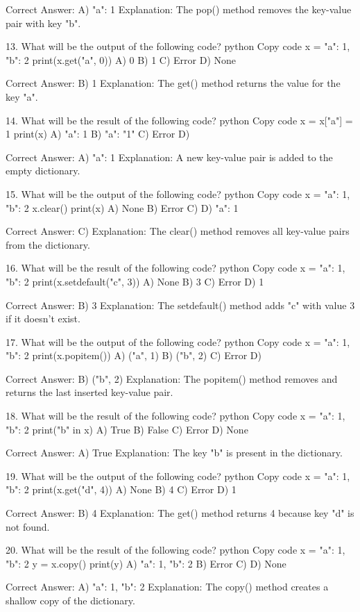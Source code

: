 Correct Answer: A) {"a": 1}
Explanation: The pop() method removes the key-value pair with key "b".

13. What will be the output of the following code?
python
Copy code
x = {"a": 1, "b": 2}
print(x.get("a", 0))
A) 0
B) 1
C) Error
D) None

Correct Answer: B) 1
Explanation: The get() method returns the value for the key "a".

14. What will be the result of the following code?
python
Copy code
x = {}
x["a"] = 1
print(x)
A) {"a": 1}
B) {"a": "1"}
C) Error
D) {}

Correct Answer: A) {"a": 1}
Explanation: A new key-value pair is added to the empty dictionary.

15. What will be the output of the following code?
python
Copy code
x = {"a": 1, "b": 2}
x.clear()
print(x)
A) None
B) Error
C) {}
D) {"a": 1}

Correct Answer: C) {}
Explanation: The clear() method removes all key-value pairs from the dictionary.

16. What will be the result of the following code?
python
Copy code
x = {"a": 1, "b": 2}
print(x.setdefault("c", 3))
A) None
B) 3
C) Error
D) 1

Correct Answer: B) 3
Explanation: The setdefault() method adds "c" with value 3 if it doesn't exist.

17. What will be the output of the following code?
python
Copy code
x = {"a": 1, "b": 2}
print(x.popitem())
A) ("a", 1)
B) ("b", 2)
C) Error
D) {}

Correct Answer: B) ("b", 2)
Explanation: The popitem() method removes and returns the last inserted key-value pair.

18. What will be the result of the following code?
python
Copy code
x = {"a": 1, "b": 2}
print("b" in x)
A) True
B) False
C) Error
D) None

Correct Answer: A) True
Explanation: The key "b" is present in the dictionary.

19. What will be the output of the following code?
python
Copy code
x = {"a": 1, "b": 2}
print(x.get("d", 4))
A) None
B) 4
C) Error
D) 1

Correct Answer: B) 4
Explanation: The get() method returns 4 because key "d" is not found.

20. What will be the result of the following code?
python
Copy code
x = {"a": 1, "b": 2}
y = x.copy()
print(y)
A) {"a": 1, "b": 2}
B) Error
C) {}
D) None

Correct Answer: A) {"a": 1, "b": 2}
Explanation: The copy() method creates a shallow copy of the dictionary.

